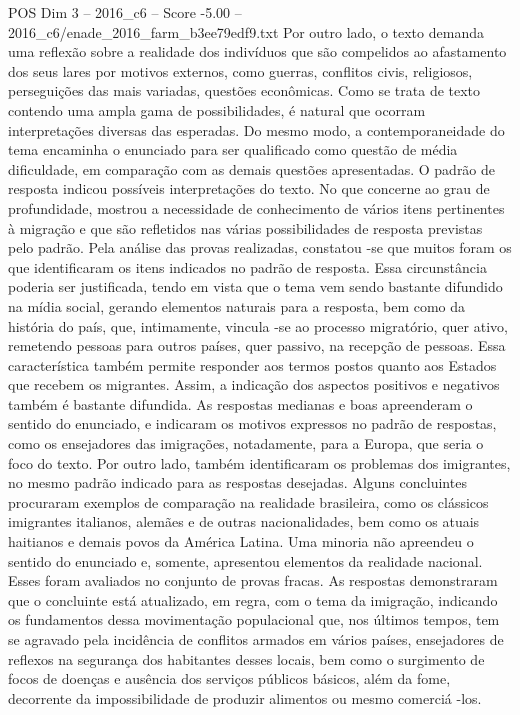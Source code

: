 \begin{textsample}{POS Dim 3 – 2016\_c6 – Score -5.00 – 2016\_c6/enade\_2016\_farm\_b3ee79edf9.txt}
Por outro lado, o texto demanda uma reflexão sobre a realidade dos indivíduos que são compelidos ao afastamento dos seus lares por motivos externos, como guerras, conflitos civis, religiosos, perseguições das mais variadas, questões econômicas.
Como se trata de texto contendo uma ampla gama de possibilidades, é natural que ocorram interpretações diversas das esperadas.
Do mesmo modo, a contemporaneidade do tema encaminha o enunciado para ser qualificado como questão de média dificuldade, em comparação com as demais questões apresentadas.
O padrão de resposta indicou possíveis interpretações do texto.
No que concerne ao grau de profundidade, mostrou a necessidade de conhecimento de vários itens pertinentes à migração e que são refletidos nas várias possibilidades de resposta previstas pelo padrão.
Pela análise das provas realizadas, constatou -se que muitos foram os que identificaram os itens indicados no padrão de resposta.
Essa circunstância poderia ser justificada, tendo em vista que o tema vem sendo bastante difundido na mídia social, gerando elementos naturais para a resposta, bem como da história do país, que, intimamente, vincula -se ao processo migratório, quer ativo, remetendo pessoas para outros países, quer passivo, na recepção de pessoas.
Essa característica também permite responder aos termos postos quanto aos Estados que recebem os migrantes.
Assim, a indicação dos aspectos positivos e negativos também é bastante difundida.
As respostas medianas e boas apreenderam o sentido do enunciado, e indicaram os motivos expressos no padrão de respostas, como os ensejadores das imigrações, notadamente, para a Europa, que seria o foco do texto.
Por outro lado, também identificaram os problemas dos imigrantes, no mesmo padrão indicado para as respostas desejadas.
Alguns concluintes procuraram exemplos de comparação na realidade brasileira, como os clássicos imigrantes italianos, alemães e de outras nacionalidades, bem como os atuais haitianos e demais povos da América Latina.
Uma minoria não apreendeu o sentido do enunciado e, somente, apresentou elementos da realidade nacional.
Esses foram avaliados no conjunto de provas fracas.
As respostas demonstraram que o concluinte está atualizado, em regra, com o tema da imigração, indicando os fundamentos dessa movimentação populacional que, nos últimos tempos, tem se agravado pela incidência de conflitos armados em vários países, ensejadores de reflexos na segurança dos habitantes desses locais, bem como o surgimento de focos de doenças e ausência dos serviços públicos básicos, além da fome, decorrente da impossibilidade de produzir alimentos ou mesmo comerciá -los.

\end{textsample}
